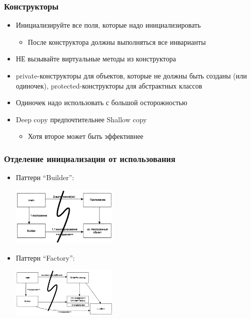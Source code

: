 \documentclass{../../slides-style}
\begin{document}
    \begin{frame}
        \frametitle{Конструкторы}
        \begin{itemize}
            \item Инициализируйте все поля, которые надо инициализировать
            \begin{itemize}
                \item После конструктора должны выполняться все инварианты
            \end{itemize}
            \item НЕ вызывайте виртуальные методы из конструктора
            \item private-конструкторы для объектов, которые не должны быть созданы (или одиночек), protected-конструкторы для абстрактных классов
            \item Одиночек надо использовать с большой осторожностью
            \item Deep copy предпочтительнее Shallow copy
            \begin{itemize}
                \item Хотя второе может быть эффективнее
            \end{itemize}
        \end{itemize}
    \end{frame}

    \begin{frame}
        \frametitle{Отделение инициализации от использования}
        \begin{itemize}
            \item Паттерн ``Builder'':
                \begin{center}
                    \includegraphics[width=0.4\textwidth]{builder.png}
                \end{center}
            \item Паттерн ``Factory'':
                \begin{center}
                    \includegraphics[width=0.4\textwidth]{factory.png}
                \end{center}
        \end{itemize}
    \end{frame}
\end{document}
